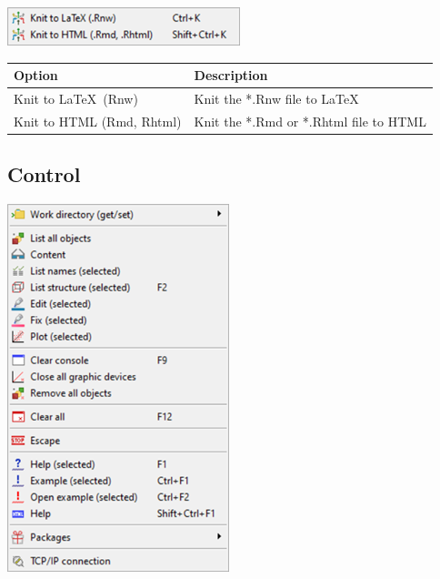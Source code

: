 \includegraphics[scale=0.8]{./res/menu_r_send_knitr.png}\\

\begin{scriptsize}
  \begin{tabularx}{\textwidth}{>{\hsize=0.3\hsize}X>{\hsize=0.7\hsize}X}\\
    \hline
    \textbf{Option} & \textbf{Description} \\
    \hline
    Knit to \LaTeX ~(Rnw) & Knit the *.Rnw file to \LaTeX \\
    Knit to HTML (Rmd, Rhtml) & Knit the *.Rmd or *.Rhtml file to HTML \\
    \hline
  \end{tabularx}
\end{scriptsize}

\hypertarget{menu_r_control}{}
\subsection{Control}

\includegraphics[scale=0.8]{./res/menu_r_control.png}\\

